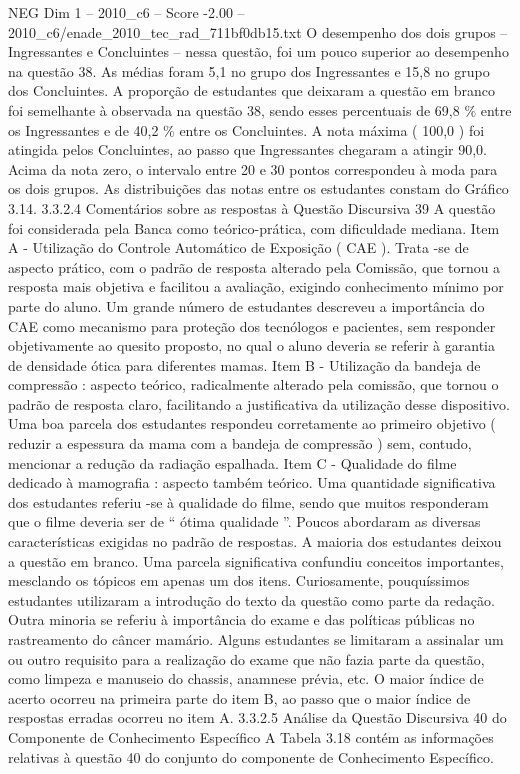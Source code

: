 \begin{textsample}{NEG Dim 1 – 2010\_c6 – Score -2.00 – 2010\_c6/enade\_2010\_tec\_rad\_711bf0db15.txt}
O desempenho dos dois grupos – Ingressantes e Concluintes – nessa questão, foi um pouco superior ao desempenho na questão 38.
As médias foram 5,1 no grupo dos Ingressantes e 15,8 no grupo dos Concluintes.
A proporção de estudantes que deixaram a questão em branco foi semelhante à observada na questão 38, sendo esses percentuais de 69,8 \% entre os Ingressantes e de 40,2 \% entre os Concluintes.
A nota máxima ( 100,0 ) foi atingida pelos Concluintes, ao passo que Ingressantes chegaram a atingir 90,0.
Acima da nota zero, o intervalo entre 20 e 30 pontos correspondeu à moda para os dois grupos.
As distribuições das notas entre os estudantes constam do Gráfico 3.14. 3.3.2.4 Comentários sobre as respostas à Questão Discursiva 39 A questão foi considerada pela Banca como teórico-prática, com dificuldade mediana.
Item A - Utilização do Controle Automático de Exposição ( CAE ).
Trata -se de aspecto prático, com o padrão de resposta alterado pela Comissão, que tornou a resposta mais objetiva e facilitou a avaliação, exigindo conhecimento mínimo por parte do aluno.
Um grande número de estudantes descreveu a importância do CAE como mecanismo para proteção dos tecnólogos e pacientes, sem responder objetivamente ao quesito proposto, no qual o aluno deveria se referir à garantia de densidade ótica para diferentes mamas.
Item B - Utilização da bandeja de compressão : aspecto teórico, radicalmente alterado pela comissão, que tornou o padrão de resposta claro, facilitando a justificativa da utilização desse dispositivo.
Uma boa parcela dos estudantes respondeu corretamente ao primeiro objetivo ( reduzir a espessura da mama com a bandeja de compressão ) sem, contudo, mencionar a redução da radiação espalhada.
Item C - Qualidade do filme dedicado à mamografia : aspecto também teórico.
Uma quantidade significativa dos estudantes referiu -se à qualidade do filme, sendo que muitos responderam que o filme deveria ser de “ ótima qualidade ”.
Poucos abordaram as diversas características exigidas no padrão de respostas.
A maioria dos estudantes deixou a questão em branco.
Uma parcela significativa confundiu conceitos importantes, mesclando os tópicos em apenas um dos itens.
Curiosamente, pouquíssimos estudantes utilizaram a introdução do texto da questão como parte da redação.
Outra minoria se referiu à importância do exame e das políticas públicas no rastreamento do câncer mamário.
Alguns estudantes se limitaram a assinalar um ou outro requisito para a realização do exame que não fazia parte da questão, como limpeza e manuseio do chassis, anamnese prévia, etc.
O maior índice de acerto ocorreu na primeira parte do item B, ao passo que o maior índice de respostas erradas ocorreu no item A. 3.3.2.5 Análise da Questão Discursiva 40 do Componente de Conhecimento Específico A Tabela 3.18 contém as informações relativas à questão 40 do conjunto do componente de Conhecimento Específico.

\end{textsample}

